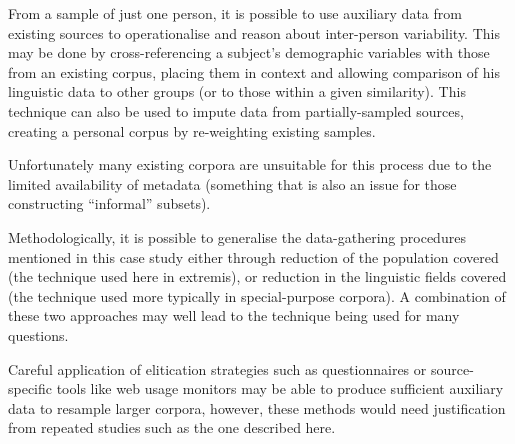 From a sample of just one person, it is possible to use auxiliary data from existing sources to operationalise and reason about inter-person variability.  This may be done by cross-referencing a subject's demographic variables with those from an existing corpus, placing them in context and allowing comparison of his linguistic data to other groups (or to those within a given similarity). This technique can also be used to impute data from partially-sampled sources, creating a personal corpus by re-weighting existing samples.

Unfortunately many existing corpora are unsuitable for this process due to the limited availability of metadata (something that is also an issue for those constructing ``informal'' subsets).

Methodologically, it is possible to generalise the data-gathering procedures mentioned in this case study either through reduction of the population covered (the technique used here in extremis), or reduction in the linguistic fields covered (the technique used more typically in special-purpose corpora).  A combination of these two approaches may well lead to the technique being used for many questions.

Careful application of elitication strategies such as questionnaires or source-specific tools like web usage monitors may be able to produce sufficient auxiliary data to resample larger corpora, however, these methods would need justification from repeated studies such as the one described here.
